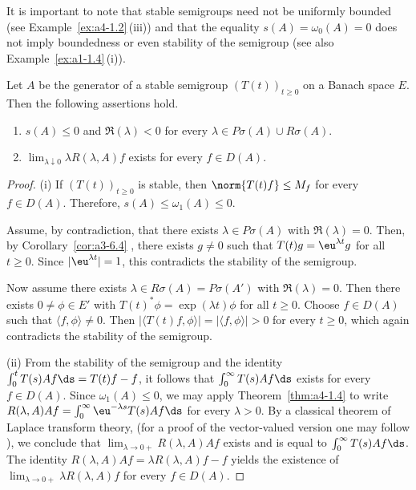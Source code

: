 It is important to note  that stable semigroups need not be uniformly bounded (see Example~\ref{ex:a4-1.2}\,(iii)) and that the equality $ s(A) = \omega_{0}(A) = 0 $ does not imply boundedness or even stability of the semigroup (see also Example~\ref{ex:a1-1.4}\,(i)).
\begin{theorem} \label{thm:a4-1.13} 
Let $ A $ be the generator of a stable semigroup $ (T(t))_{t \geq 0} $ on a Banach space $ E $. Then the following assertions hold.
\begin{enumerate}[\upshape (i)]
    \item 
    $ s(A) \leq 0 $ and $ \Re(\lambda) < 0 $ for every $ \lambda \in P\sigma (A) \cup R\sigma(A) $.
    
    \item 
    $ \lim_{\lambda \downarrow 0} \lambda R(\lambda, A) f $ exists for every $ f \in D(A) $.
\end{enumerate}
\end{theorem}
\begin{proof} (i) If\/ $ (T(t))_{t \geq 0} $ is stable, then $ \norm{T(t) f} \leq M_f $ for every $ f \in D(A) $. Therefore, $ s(A) \leq \omega_1(A) \leq 0 $. 

Assume, by contradiction, that there exists $ \lambda \in P\sigma(A) $ with $ \Re(\lambda) = 0 $. 
Then, by Corollary~\ref{cor:a3-6.4} , there exists $ g \neq 0 $ such that $ T(t) g = \eu^{\lambda t} g $ for all $ t \geq 0 $. Since $ |\eu^{\lambda t}| = 1 $, this contradicts the stability of the semigroup. 

Now assume there exists $ \lambda \in R\sigma(A) = P\sigma(A') $ with $ \Re(\lambda) = 0 $. 
Then there exists $ 0 \neq \phi \in E' $ with $ T(t)^* \phi = \exp(\lambda t) \phi $ for all $ t \geq 0 $. Choose $ f \in D(A) $ such that $ \langle f, \phi \rangle \neq 0 $. 
Then $ |\langle T(t) f, \phi \rangle| = | \langle f, \phi \rangle| > 0 $ for every $ t \geq 0 $, which again contradicts the stability of the semigroup.

(ii) From the stability of the semigroup and the identity   $\int_{0}^{t} T(s) A f  \ds = T(t) f - f$, it follows that  
$\int_{0}^{\infty} T(s) A f  \ds$ exists for every $ f \in D(A) $.  
Since $ \omega_1(A) \leq 0 $, we may apply Theorem~\ref{thm:a4-1.4} to write  $ R(\lambda, A) A f = \int_{0}^{\infty} \eu^{-\lambda s} T(s) A f  \ds $ for every $ \lambda > 0 $. 
By a classical theorem of Laplace transform theory, (for a proof of the vector-valued version one may follow \textcite[p.196]{widder:1971}), we conclude that $\lim_{\lambda \to 0+} R(\lambda,A)Af$ exists
and is equal to $\int_{0}^{\infty} T(s)Af  \ds$. 
The identity $R(\lambda,A)Af = \lambda R(\lambda,A)f - f$
yields the existence of\/ $\lim_{\lambda \to 0+} \lambda R(\lambda,A)f$ for every $f \in D(A)$.
\end{proof}

